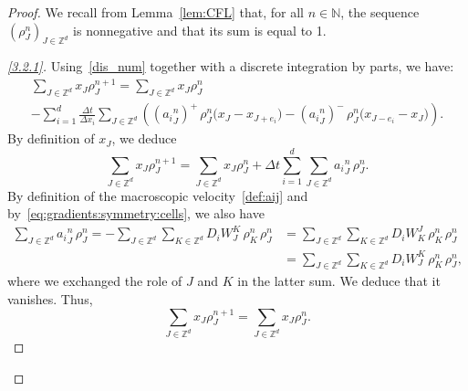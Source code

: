 \documentclass[11pt]{article}
\theoremstyle{definition}
\numberwithin{equation}{section}
\newcommand*\NN{\mathbb{N}}
\newcommand*\ZZ{\mathbb{Z}}
\newenvironment{step}[1]{\begin{proof}[#1]}{\let\qed\relax \end{proof}}
\begin{document}
\begin{proof}
We recall from Lemma~\ref{lem:CFL} that, for all $n\in \NN$, the sequence $(\rho_{J}^n)_{J \in \ZZ^d}$ is nonnegative and that its sum is equal to 1.

\begin{step}{\eqref{3.2.1}}
Using~\eqref{dis_num} together with a discrete integration by parts, we have:
\begin{multline*}
 \sum_{J\in \ZZ^d} x_J\rho_{J}^{n+1} = \sum_{J\in
\ZZ^d} x_J\rho_{J}^n \\
 - \sum_{i=1}^d\frac{\Delta t}{\Delta x_i} \sum_{J\in
\ZZ^d} \left(({a_i}^n_{J})^+ \, \rho_{J}^n \big(x_J-x_{J+e_i}\big) -({a_i}^n_{J})^- \, \rho_{J}^n \big(x_{J-e_i}-x_J\big) \right).
\end{multline*}
By definition of $x_J$, we deduce
\[
\sum_{J\in \ZZ^d} x_J\rho_{J}^{n+1} = \sum_{J\in \ZZ^d} x_J\rho_{J}^n + \Delta t \sum_{i=1}^d \sum_{J\in \ZZ^d} {a_i}^n_{J} \, \rho_{J}^n.
\]
By definition of the macroscopic velocity~\eqref{def:aij} and by~\eqref{eq:gradients:symmetry:cells}, we also have
\begin{equation*}
\begin{split}
\sum_{J\in \ZZ^d} {a_i}^n_{J} \, \rho_{J}^n = -\sum_{J\in \ZZ^d} \sum_{K\in \ZZ^d} D_iW_{J}^{K}\, \rho_{K}^n \, \rho_{J}^n &= \sum_{J\in \ZZ^d} \sum_{K\in \ZZ^d} D_iW^{J}_{K}\, \rho_{K}^n \, \rho_{J}^n
\\
&= \sum_{J\in \ZZ^d} \sum_{K\in \ZZ^d} D_iW^{K}_{J}\, \rho_{K}^n \, \rho_{J}^n,
\end{split}
\end{equation*}
where we exchanged the role of $J$ and $K$ in the latter sum. We deduce that it vanishes. Thus,
\[
\sum_{J\in \ZZ^d} x_J\rho_{J}^{n+1} = \sum_{J\in \ZZ^d} x_J\rho_{J}^n.
\]
\end{step}


\end{proof}
\end{document}
